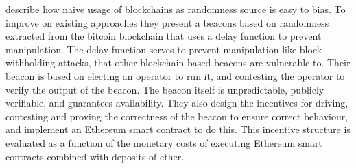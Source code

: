 \item[Proofs-of-Delay and Randomness Beacons in Ethereum]
\citet{bunz2017proofsof} describe how naive usage of blockchains as randomness source is easy to bias. To improve on existing approaches they present a beacons based on randomness extracted from the bitcoin blockchain that uses a delay function to prevent manipulation. The delay function serves to prevent manipulation like block-withholding attacks, that other blockchain-based beacons are vulnerable to. Their beacon is based on electing an operator to run it, and contesting the operator to verify the output of the beacon. The beacon itself is unpredictable, publicly verifiable, and guarantees availability. They also design the incentives for driving, contesting and proving the correctness of the beacon to ensure correct behaviour, and implement an Ethereum smart contract to do this. This incentive structure is evaluated as a function of the monetary costs of executing Ethereum smart contracts combined with deposits of ether. 